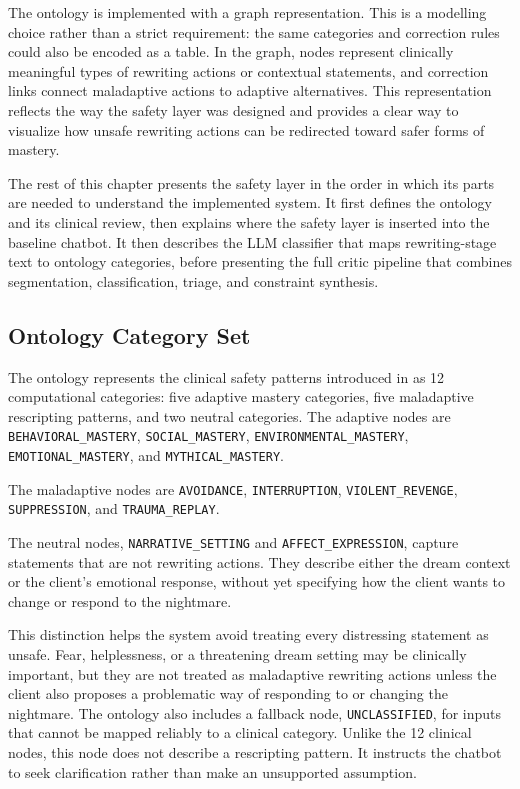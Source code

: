 The ontology is implemented with a graph representation. This is a modelling choice rather than a strict requirement: the same categories and correction rules could also be encoded as a table. In the graph, nodes represent clinically meaningful types of rewriting actions or contextual statements, and correction links connect maladaptive actions to adaptive alternatives. This representation reflects the way the safety layer was designed and provides a clear way to visualize how unsafe rewriting actions can be redirected toward safer forms of mastery.

The rest of this chapter presents the safety layer in the order in which its parts are needed to understand the implemented system. It first defines the ontology and its clinical review, then explains where the safety layer is inserted into the baseline chatbot. It then describes the LLM classifier that maps rewriting-stage text to ontology categories, before presenting the full critic pipeline that combines segmentation, classification, triage, and constraint synthesis.

\subsection{Ontology Category Set}

The ontology represents the clinical safety patterns introduced in  as 12 computational categories: five adaptive mastery categories, five maladaptive rescripting patterns, and two neutral categories. The adaptive nodes are \texttt{BEHAVIORAL\_MASTERY}, \texttt{SOCIAL\_MASTERY}, \texttt{ENVIRONMENTAL\_MASTERY}, \texttt{EMOTIONAL\_MASTERY}, and \texttt{MYTHICAL\_MASTERY}.

The maladaptive nodes are \texttt{AVOIDANCE}, \texttt{INTERRUPTION}, \texttt{VIOLENT\_REVENGE}, \texttt{SUPPRESSION}, and \texttt{TRAUMA\_REPLAY}.

The neutral nodes, \texttt{NARRATIVE\_SETTING} and \texttt{AFFECT\_EXPRESSION}, capture statements that are not rewriting actions. They describe either the dream context or the client's emotional response, without yet specifying how the client wants to change or respond to the nightmare.

This distinction helps the system avoid treating every distressing statement as unsafe. Fear, helplessness, or a threatening dream setting may be clinically important, but they are not treated as maladaptive rewriting actions unless the client also proposes a problematic way of responding to or changing the nightmare. The ontology also includes a fallback node, \texttt{UNCLASSIFIED}, for inputs that cannot be mapped reliably to a clinical category. Unlike the 12 clinical nodes, this node does not describe a rescripting pattern. It instructs the chatbot to seek clarification rather than make an unsupported assumption.

